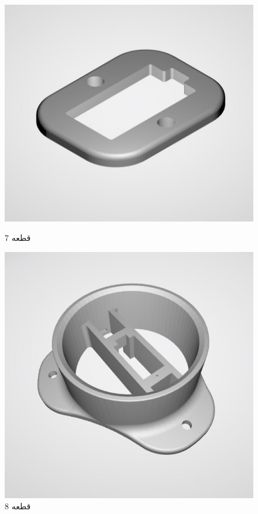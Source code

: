 \documentclass{article}
\begin{document}
\begin{figure}[H]
    \centering
    \begin{minipage}{0.5\linewidth}
        \centering
        \includegraphics[width=0.9\linewidth]{7.JPG}
        \caption{قطعه 7}
        \label{fig:label7}
    \end{minipage}%
    \begin{minipage}{0.5\linewidth}
        \centering
        \includegraphics[width=0.9\linewidth]{8.JPG}
        \caption{قطعه 8}
        \label{fig:label8}
    \end{minipage}
\end{figure}
\end{document}
